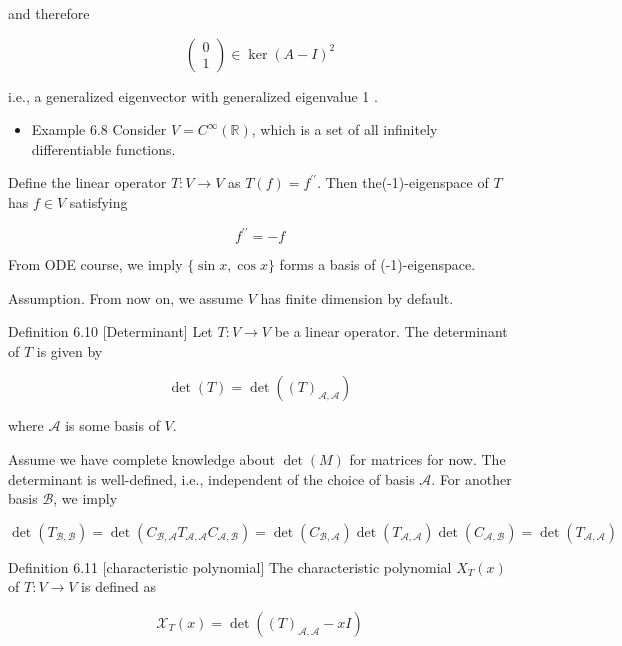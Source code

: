 \documentclass[11pt]{article}
\begin{document}
and therefore

\[
\left( \begin{array}{l} 0 \\  1 \end{array}\right)  \in  \ker {\left( A - I\right) }^2
\]

i.e., a generalized eigenvector with generalized eigenvalue 1 .

\begin{itemize}
\item Example 6.8 Consider \(V = {C}^{\infty }\left( \mathbb{R}\right)\), which is a set of all infinitely differentiable functions.
\end{itemize}

Define the linear operator \(T : V \rightarrow  V\) as \(T\left( f\right)  = {f}^{\prime \prime }\). Then the(-1)-eigenspace of \(T\) has \(f \in  V\) satisfying

\[
{f}^{\prime \prime } =  - f
\]

From ODE course, we imply \(\{ \sin x,\cos x\}\) forms a basis of (-1)-eigenspace.

Assumption. From now on, we assume \(V\) has finite dimension by default.

Definition 6.10 [Determinant] Let \(T : V \rightarrow  V\) be a linear operator. The determinant of \(T\) is given by

\[
\det \left( T\right)  = \det \left( {\left( T\right) }_{\mathcal{A},\mathcal{A}}\right)
\]

where \(\mathcal{A}\) is some basis of \(V\).

Assume we have complete knowledge about \(\det \left( M\right)\) for matrices for now. The determinant is well-defined, i.e., independent of the choice of basis \(\mathcal{A}\). For another basis \(\mathcal{B}\), we imply

\(\det \left( {T}_{\mathcal{B},\mathcal{B}}\right)  = \det \left( {{C}_{\mathcal{B},\mathcal{A}}{T}_{\mathcal{A},\mathcal{A}}{C}_{\mathcal{A},\mathcal{B}}}\right)  = \det \left( {C}_{\mathcal{B},\mathcal{A}}\right) \det \left( {T}_{\mathcal{A},\mathcal{A}}\right) \det \left( {C}_{\mathcal{A},\mathcal{B}}\right)  = \det \left( {T}_{\mathcal{A},\mathcal{A}}\right)\)

Definition 6.11 [characteristic polynomial] The characteristic polynomial \({X}_{T}\left( x\right)\) of \(T : V \rightarrow  V\) is defined as

\[
{\mathcal{X}}_{T}\left( x\right)  = \det \left( {{\left( T\right) }_{\mathcal{A},\mathcal{A}} - {xI}}\right)
\]
\end{document}
